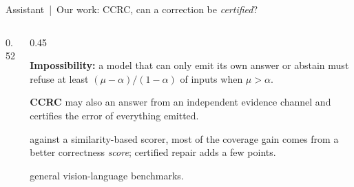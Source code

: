 \documentclass[aspectratio=169,10pt]{beamer}
\begin{document}
\begin{frame}{Assistant \,|\, Our work: CCRC, can a correction be \emph{certified}?}
\begin{columns}[T]
\begin{column}{0.52\textwidth}
\begin{sfig}[0.66]
\end{sfig}
\end{column}
\begin{column}{0.45\textwidth}
{\footnotesize
\textbf{Impossibility:} a model that can only emit its own answer or abstain must refuse at least $(\mu-\alpha)/(1-\alpha)$ of inputs when $\mu>\alpha$.

\vspace{2mm}
\textbf{CCRC} may also  an answer from an independent evidence channel and certifies the error of everything emitted.

\vspace{2mm}
 against a similarity-based scorer, most of the coverage gain comes from a better correctness \emph{score}; certified repair adds a few points.

\vspace{2mm}
 general vision-language benchmarks.}
\end{column}
\end{columns}
\end{frame}
\end{document}
